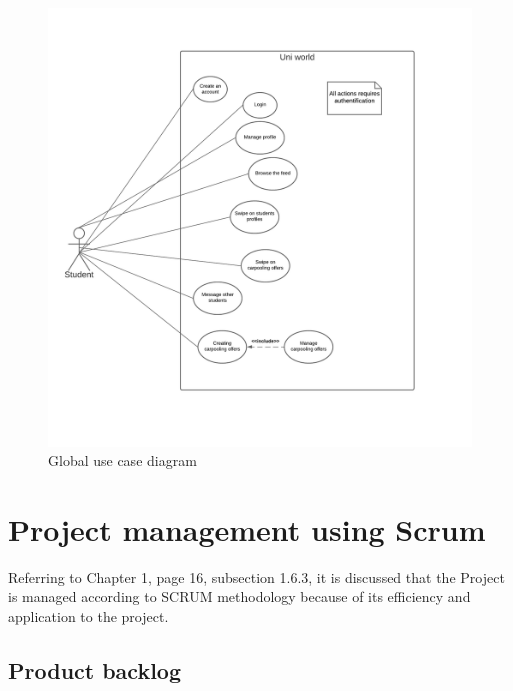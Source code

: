 \begin{figure}[H] 
            \centering
            \includegraphics[scale=0.5]{diagrams/global use case.png}
            \caption{Global use case diagram} 
            \label{fig: Global use case diagram}
\end{figure}
\space
\section{Project management using Scrum}
Referring to Chapter 1, page 16, subsection 1.6.3, it is discussed that the Project is managed according to SCRUM methodology because of its efficiency and application to the project.

\subsection{Product backlog}

